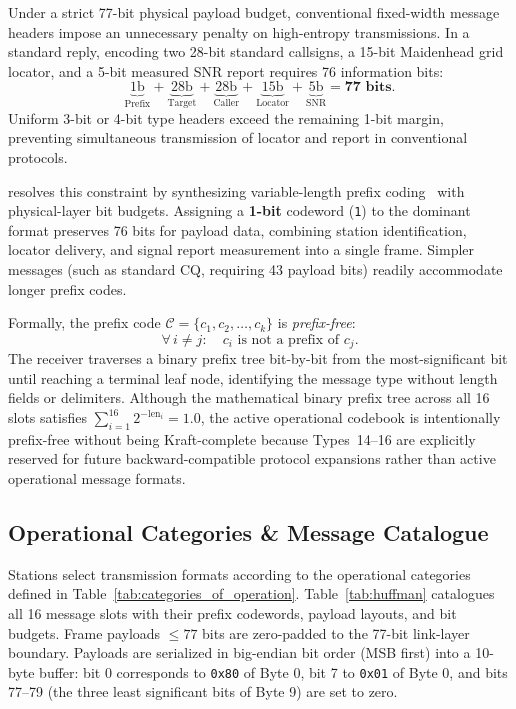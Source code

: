 Under a strict 77-bit physical payload budget, conventional fixed-width message headers impose an unnecessary penalty on high-entropy transmissions. In a standard  reply, encoding two 28-bit standard callsigns, a 15-bit Maidenhead grid locator, and a 5-bit measured SNR report requires 76 information bits:
\begin{equation}
  \underbrace{1\text{b}}_{\text{Prefix}} + \underbrace{28\text{b}}_{\text{Target}} + \underbrace{28\text{b}}_{\text{Caller}} + \underbrace{15\text{b}}_{\text{Locator}} + \underbrace{5\text{b}}_{\text{SNR}} = \mathbf{77\text{ bits}}.
\label{eq:call_budget}
\end{equation}
Uniform 3-bit or 4-bit type headers exceed the remaining 1-bit margin, preventing simultaneous transmission of locator and report in conventional protocols.

\LQ{} resolves this constraint by synthesizing variable-length prefix coding~\cite{huffman,shannon} with physical-layer bit budgets. Assigning a \textbf{1-bit} codeword (\texttt{1}) to the dominant  format preserves 76 bits for payload data, combining station identification, locator delivery, and signal report measurement into a single frame. Simpler messages (such as standard CQ, requiring 43 payload bits) readily accommodate longer prefix codes.

Formally, the prefix code $\mathcal{C} = \{c_1, c_2, \ldots, c_k\}$ is \emph{prefix-free}:
\begin{equation}
  \forall\, i \neq j: \quad c_i \text{ is not a prefix of } c_j.
\end{equation}
The receiver traverses a binary prefix tree bit-by-bit from the most-significant bit until reaching a terminal leaf node, identifying the message type without length fields or delimiters. Although the mathematical binary prefix tree across all 16 slots satisfies $\sum_{i=1}^{16} 2^{-\text{len}_i} = 1.0$, the active operational codebook is intentionally prefix-free without being Kraft-complete because Types~14--16 are explicitly reserved for future backward-compatible protocol expansions rather than active operational message formats.

\subsection{Operational Categories \& Message Catalogue}
\label{sec:msg:catalogue}

Stations select transmission formats according to the operational categories defined in Table~\ref{tab:categories_of_operation}. Table~\ref{tab:huffman} catalogues all 16 message slots with their prefix codewords, payload layouts, and bit budgets. Frame payloads $\le 77$ bits are zero-padded to the 77-bit link-layer boundary. Payloads are serialized in big-endian bit order (MSB first) into a 10-byte buffer: bit 0 corresponds to \texttt{0x80} of Byte 0, bit 7 to \texttt{0x01} of Byte 0, and bits 77--79 (the three least significant bits of Byte 9) are set to zero.

